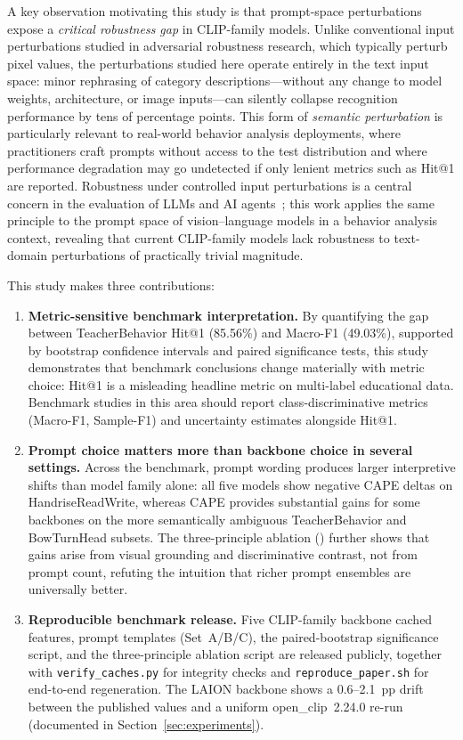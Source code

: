 \documentclass[symmetry,article,submit,pdftex,moreauthors]{Definitions/mdpi}
\begin{document}
A key observation motivating this study is that prompt-space perturbations expose a \emph{critical robustness gap} in CLIP-family models. Unlike conventional input perturbations studied in adversarial robustness research, which typically perturb pixel values, the perturbations studied here operate entirely in the text input space: minor rephrasing of category descriptions---without any change to model weights, architecture, or image inputs---can silently collapse recognition performance by tens of percentage points. This form of \emph{semantic perturbation} is particularly relevant to real-world behavior analysis deployments, where practitioners craft prompts without access to the test distribution and where performance degradation may go undetected if only lenient metrics such as Hit@1 are reported. Robustness under controlled input perturbations is a central concern in the evaluation of LLMs and AI agents~\cite{zhou2025security_llm,deng2025ai_agents}; this work applies the same principle to the prompt space of vision--language models in a behavior analysis context, revealing that current CLIP-family models lack robustness to text-domain perturbations of practically trivial magnitude.

This study makes three contributions:

\begin{enumerate}
    \item \textbf{Metric-sensitive benchmark interpretation.} By quantifying the gap between TeacherBehavior Hit@1 (85.56\%) and Macro-F1 (49.03\%), supported by bootstrap confidence intervals and paired significance tests, this study demonstrates that benchmark conclusions change materially with metric choice: Hit@1 is a misleading headline metric on multi-label educational data. Benchmark studies in this area should report class-discriminative metrics (Macro-F1, Sample-F1) and uncertainty estimates alongside Hit@1.

    \item \textbf{Prompt choice matters more than backbone choice in several settings.} Across the benchmark, prompt wording produces larger interpretive shifts than model family alone: all five models show negative CAPE deltas on HandriseReadWrite, whereas CAPE provides substantial gains for some backbones on the more semantically ambiguous TeacherBehavior and BowTurnHead subsets. The three-principle ablation () further shows that gains arise from visual grounding and discriminative contrast, not from prompt count, refuting the intuition that richer prompt ensembles are universally better.

    \item \textbf{Reproducible benchmark release.} Five CLIP-family backbone cached features, prompt templates (Set~A/B/C), the paired-bootstrap significance script, and the three-principle ablation script are released publicly, together with \texttt{verify\_caches.py} for integrity checks and \texttt{reproduce\_paper.sh} for end-to-end regeneration. The LAION backbone shows a 0.6--2.1~pp drift between the published values and a uniform open\_clip~2.24.0 re-run (documented in Section~\ref{sec:experiments}).
\end{enumerate}
\end{document}
